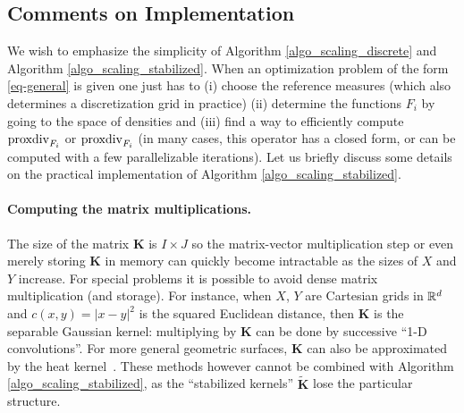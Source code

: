 \subsection{Comments on Implementation}
\label{sec_implementation}

We wish to emphasize the simplicity of Algorithm \ref{algo_scaling_discrete} and Algorithm \ref{algo_scaling_stabilized}. 
When an optimization problem of the form \eqref{eq-general} is given one just has to (i) choose the reference measures (which also determines a discretization grid in practice) (ii) determine the functions $F_i$ by going to the space of densities and (iii) find a way to efficiently compute $\operatorname{proxdiv}_{F_i}$ or $\operatorname{proxdiv}_{F_i}$ (in many cases, this operator has a closed form, or can be computed with a few parallelizable iterations). Let us briefly discuss some details on the practical implementation of Algorithm \ref{algo_scaling_stabilized}.



\paragraph{Computing the matrix multiplications.}
The size of the matrix $\mathbf{K}$ is $I\times J$ so the matrix-vector multiplication step or even merely storing $\mathbf{K}$ in memory can quickly become intractable as the sizes of $X$ and $Y$ increase.
%
For special problems it is possible to avoid dense matrix multiplication (and storage). For instance, when $X$, $Y$ are Cartesian grids in $\mathbb{R}^d$ and $c(x,y) = |x-y|^2$ is the squared Euclidean distance, then $\mathbf{K}$ is the separable Gaussian kernel: multiplying by $\mathbf{K}$ can be done by successive ``1-D convolutions''. For more general geometric surfaces, $\mathbf{K}$ can also be approximated by the heat kernel~\cite{2015-solomon-siggraph}.
%
These methods however cannot be combined with Algorithm \ref{algo_scaling_stabilized}, as the ``stabilized kernels'' $\tilde{\mathbf{K}}$ lose the particular structure.
%
